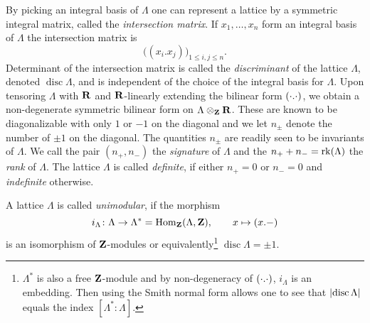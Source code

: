 By picking an integral basis of $\Lambda$ one can represent a lattice by a symmetric integral matrix, called the \emph{intersection matrix}. If $x_1, \dots, x_n$ form an integral basis of $\Lambda$ the intersection matrix is
\[
    \bigl( (x_i.x_j)\bigr)_{1 \leq i, j \leq n}.
\]
Determinant of the intersection matrix is called the \emph{discriminant} of the lattice $\Lambda$, denoted $\operatorname{disc}\Lambda$, and is independent of the choice of the integral basis for $\Lambda$. Upon tensoring $\Lambda$ with $\mathbf R$ and $\mathbf R$-linearly extending the bilinear form $(\cdot.\cdot)$, we obtain a non-degenerate symmetric bilinear form on $\Lambda \otimes_\mathbf Z \mathbf R$. These are known to be diagonalizable with only $1$ or $-1$ on the diagonal and we let $n_\pm$ denote the number of $\pm 1$ on the diagonal. The quantities $n_\pm$ are readily seen to be invariants of $\Lambda$. We call the pair $(n_+, n_-)$ the \emph{signature} of $\Lambda$ and the $n_+ + n_- = \operatorname{rk}(\Lambda)$ the \emph{rank} of $\Lambda$. The lattice $\Lambda$ is called \emph{definite}, if either $n_+ = 0$ or $n_- = 0$ and \emph{indefinite} otherwise.





\begin{definition}
    A lattice $\Lambda$ is called \emph{unimodular}, if the morphism
    \[
        i_\Lambda \colon \Lambda \to \Lambda^* = \operatorname{Hom}_\mathbf Z(\Lambda, \mathbf Z), \qquad x \mapsto (x.-)
    \]
    is an isomorphism of $\mathbf Z$-modules or equivalently\footnote{
        $\Lambda^*$ is also a free $\mathbf Z$-module and by non-degeneracy of $(\cdot.\cdot)$, $i_\Lambda$ is an embedding. Then \eg using the Smith normal form allows one to see that $\left\lvert \operatorname{disc}\Lambda \right\rvert$ equals the index $[\Lambda^* : \Lambda]$.
    } $\operatorname{disc}\Lambda = \pm 1$.
\end{definition}

